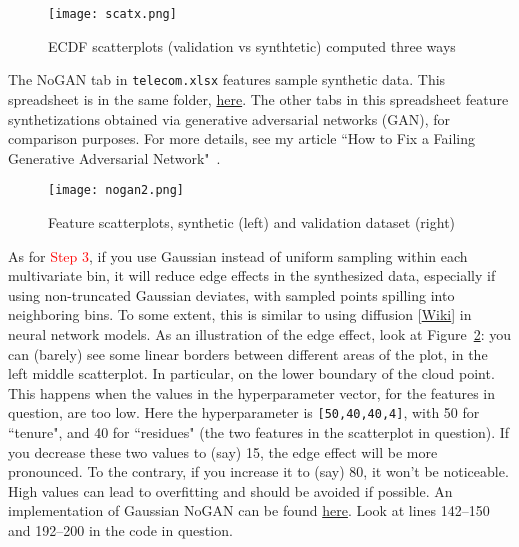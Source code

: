 \documentclass[oneside,10pt]{book}
\begin{document}
\begin{figure}[H]
\centering
\texttt{[image: scatx.png]}   
\caption{ECDF scatterplots (validation vs synthtetic) computed three ways}
\label{fig:scatxntr4x2998cv}
\end{figure}

The NoGAN tab in \texttt{telecom.xlsx} features sample synthetic data. This spreadsheet is  in 
 the same folder, \href{https://github.com/VincentGranville/Main/blob/main/telecom.xlsx}{here}.
 The other tabs in this spreadsheet feature synthetizations obtained via 
\textcolor{index}{generative adversarial networks} (GAN), for comparison 
 purposes. For more details, see my article ``How to Fix a Failing Generative Adversarial Network"~\cite{failedgan}.



\begin{figure}[H]
\centering
\texttt{[image: nogan2.png]}   
\caption{Feature scatterplots, synthetic (left) and validation dataset (right)}
\label{fig:scxcby5rtg}
\end{figure}

As for \textcolor{red}{Step 3}, if you use Gaussian instead of uniform sampling within each multivariate bin, 
 it will reduce edge effects in the synthesized data,
especially if using non-truncated Gaussian deviates, with sampled points spilling into neighboring bins. To some extent, this is similar
 to using \textcolor{index}{diffusion} [\href{https://en.wikipedia.org/wiki/Diffusion_model}{Wiki}] in neural network models.
As an illustration of the edge effect, look at Figure~\ref{fig:scxcby5rtg}: you can (barely) see some linear
 borders between different areas of the plot, in the left middle scatterplot. In particular, on the lower boundary of the 
cloud point. This happens when the values in the hyperparameter vector, for the features in question, are too low.
 Here the hyperparameter is \texttt{[50,40,40,4]}, with 50 for ``tenure", and 40 for ``residues" (the two features
 in the scatterplot in question). If you decrease these two values to (say) 15, the edge effect will be more pronounced. To the contrary, if you increase it to (say) 80, it won't be noticeable. High values can lead to overfitting and should be avoided if possible. 
An implementation of Gaussian NoGAN can be found \href{https://github.com/VincentGranville/Main/blob/main/NoGAN_gaussian.py}{here}. Look at lines 142--150 and 192--200 in the code in question.
\end{document}
